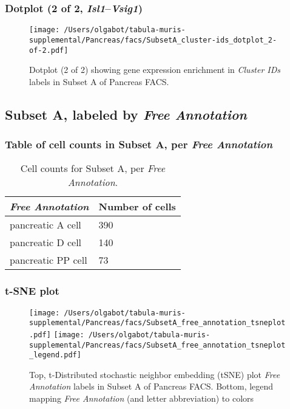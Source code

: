 \clearpage

\subsubsection{Dotplot (2 of 2, \emph{Isl1}--\emph{Vsig1})}
\begin{figure}[h]
\centering
\texttt{[image: /Users/olgabot/tabula-muris-supplemental/Pancreas/facs/SubsetA\_cluster-ids\_dotplot\_2-of-2.pdf]}

\caption{ Dotplot (2 of 2)  showing gene expression enrichment in \emph{Cluster IDs} labels in Subset A of Pancreas FACS. }
\end{figure}


\clearpage

\subsection{Subset A, labeled by \emph{Free Annotation}}
\subsubsection{Table of cell counts in Subset A, per \emph{Free Annotation}}\begin{table}[h]
\centering
\label{my-label}
\begin{tabular}{@{}ll@{}}
\toprule

\emph{Free Annotation}& Number of cells \\ \midrule
pancreatic A cell & 390 \\

pancreatic D cell & 140 \\

pancreatic PP cell & 73 \\
\bottomrule
\end{tabular}
\caption{Cell counts for Subset A, per \emph{Free Annotation}.}
\end{table}

\clearpage
\subsubsection{t-SNE plot}
\begin{figure}[h]
\centering
\texttt{[image: /Users/olgabot/tabula-muris-supplemental/Pancreas/facs/SubsetA\_free\_annotation\_tsneplot.pdf]}
\texttt{[image: /Users/olgabot/tabula-muris-supplemental/Pancreas/facs/SubsetA\_free\_annotation\_tsneplot\_legend.pdf]}
\caption{Top, t-Distributed stochastic neighbor embedding (tSNE) plot  \emph{Free Annotation} labels in Subset A of Pancreas FACS. Bottom, legend mapping \emph{Free Annotation} (and letter abbreviation) to colors}
\end{figure}


